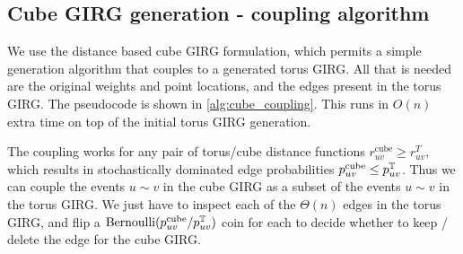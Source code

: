 
\subsection{Cube GIRG generation - coupling algorithm}
We use the distance based cube GIRG formulation, which permits a simple generation algorithm that couples to a generated torus GIRG. All that is needed are the original weights and point locations, and the edges present in the torus GIRG. The pseudocode is shown in \cref{alg:cube_coupling}. This runs in $O(n)$ extra time on top of the initial torus GIRG generation.

The coupling works for any pair of torus/cube distance functions $r_{uv}^\text{cube} \geq r_{uv}^T$, which results in stochastically dominated edge probabilities $p_{uv}^\text{cube} \leq p_{uv}^{\mathbb{T}}$. Thus we can couple the events $u \sim v$ in the cube GIRG as a subset of the events $u \sim v$ in the torus GIRG. We just have to inspect each of the $\Theta(n)$ edges in the torus GIRG, and flip a $\operatorname{Bernoulli}(p_{uv}^\text{cube} / p_{uv}^{\mathbb{T}})$ coin for each to decide whether to keep / delete the edge for the cube GIRG.


